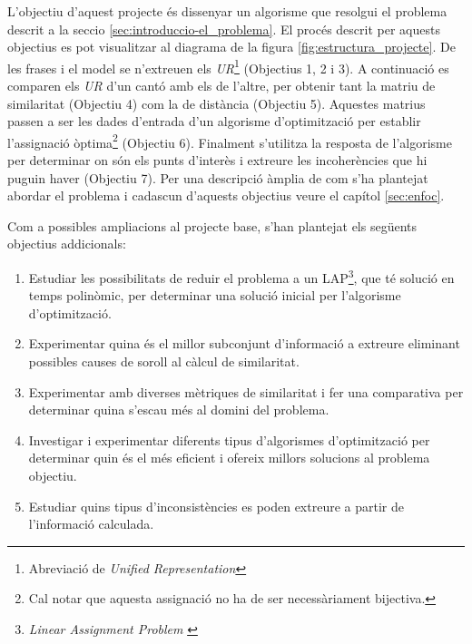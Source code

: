 L'objectiu d'aquest projecte és dissenyar un algorisme que resolgui el problema descrit a la seccio \ref{sec:introduccio-el_problema}. El procés descrit per aquests objectius es pot visualitzar al diagrama de la figura \ref{fig:estructura_projecte}. De les frases i el model se n'extreuen els \emph{UR}\footnote{Abreviació de \emph{Unified Representation}} (Objectius 1, 2 i 3). A continuació es comparen els \emph{UR} d'un cantó amb els de l'altre, per obtenir tant la matriu de similaritat (Objectiu 4) com la de distància (Objectiu 5). Aquestes matrius passen a ser les dades d'entrada d'un algorisme d'optimització per establir l'assignació òptima\footnote{Cal notar que aquesta assignació no ha de ser necessàriament bijectiva.} (Objectiu 6). Finalment s'utilitza la resposta de l'algorisme per determinar on són els punts d'interès i extreure les incoherències que hi puguin haver (Objectiu 7). Per una descripció àmplia de com s'ha plantejat abordar el problema i cadascun d'aquests objectius veure el capítol \ref{sec:enfoc}. 

Com a possibles ampliacions al projecte base, s'han plantejat els següents objectius addicionals:

\begin{enumerate}
    \item Estudiar les possibilitats de reduir el problema a un LAP\footnote{\emph{Linear Assignment Problem} \cite{LAP}}, que té solució en temps polinòmic, per determinar una solució inicial per l'algorisme d'optimització.
    \item Experimentar quina és el millor subconjunt d'informació a extreure eliminant possibles causes de soroll al càlcul de similaritat.
    \item Experimentar amb diverses mètriques de similaritat i fer una comparativa per determinar quina s'escau més al domini del problema.
    \item Investigar i experimentar diferents tipus d'algorismes d'optimització per determinar quin és el més eficient i ofereix millors solucions al problema objectiu.
    \item Estudiar quins tipus d'inconsistències es poden extreure a partir de l'informació calculada.
\end{enumerate}

